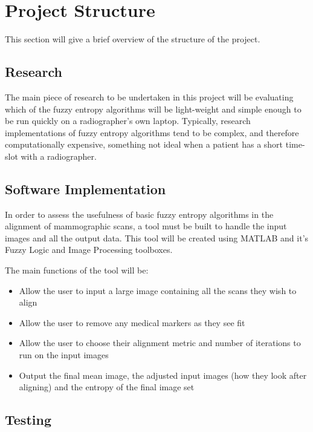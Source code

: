 \section{Project Structure}

This section will give a brief overview of the structure of the project.

\subsection{Research}

The main piece of research to be undertaken in this project will be evaluating which of the fuzzy entropy algorithms will be light-weight and simple enough to be run quickly on a radiographer's own laptop. Typically, research implementations of fuzzy entropy algorithms tend to be complex, and therefore computationally expensive, something not ideal when a patient has a short time-slot with a radiographer.

\subsection{Software Implementation}

In order to assess the usefulness of basic fuzzy entropy algorithms in the alignment of mammographic scans, a tool must be built to handle the input images and all the output data. This tool will be created using MATLAB \cite{MATLAB:2016} and it's Fuzzy Logic \cite{fuzzy_toolbox} and Image Processing \cite{image_toolbox} toolboxes.

The main functions of the tool will be:

\begin{itemize}
  \item Allow the user to input a large image containing all the scans they wish to align
  \item Allow the user to remove any medical markers as they see fit
  \item Allow the user to choose their alignment metric and number of iterations to run on the input images
  \item Output the final mean image, the adjusted input images (how they look after aligning) and the entropy of the final image set
\end{itemize}

\subsection{Testing}

